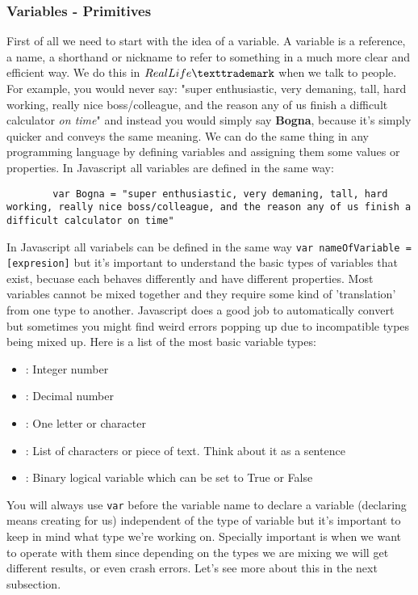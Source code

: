 \subsubsection{Variables - Primitives}
\label{subsub:primitives}
First of all we need to start with the idea of a variable. A variable is a reference, a name, a shorthand or nickname to refer to something in a much more clear and efficient way.  We do this in $Real Life\texttrademark$  when we talk to people. For example, you would never say: "super enthusiastic, very demaning, tall, hard working, really nice boss/colleague, and the reason any of us finish a difficult calculator \textit{on time}" and instead you would simply say \textbf{Bogna}, because it's simply quicker and conveys the same meaning.
We can do the same thing in any programming language by defining variables and assigning them some values or properties. In Javascript all variables are defined in the same way:
\begin{lstlisting}
        var Bogna = "super enthusiastic, very demaning, tall, hard working, really nice boss/colleague, and the reason any of us finish a difficult calculator on time"
\end{lstlisting}

In Javascript all variabels can be defined in the same way \texttt{var nameOfVariable = [expresion]} but it's important to understand the basic types of variables that exist, becuase each behaves differently and have different properties. Most variables cannot be mixed together and they require some kind of 'translation' from one type to another. Javascript does a good job to automatically convert but sometimes you might find weird errors popping up due to incompatible types being mixed up.
Here is a list of the most basic variable types:
\begin{itemize}
    \item {}: Integer number
    \item {}: Decimal number
    \item {}: One letter or character
    \item {}: List of characters or piece of text. Think about it as a sentence
    \item {}: Binary logical variable which can be set to True or False
\end{itemize}

You will always use \texttt{var} before the variable name to declare a variable (declaring means creating for us) independent of the type of variable but it's important to keep in mind what type we're working on. Specially important is when we want to operate with them since depending on the types we are mixing we will get different results, or even crash errors. Let's see more about this in the next subsection.  

